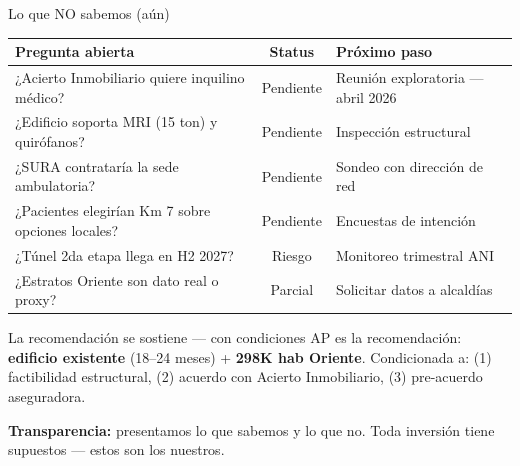 \documentclass[aspectratio=169, 11pt]{beamer}
\begin{document}
{
\begin{frame}{Lo que NO sabemos (aún)}
{\scriptsize
\begin{tabular}{@{}p{5cm}cp{5.5cm}@{}}
\toprule
\textbf{Pregunta abierta} & \textbf{Status} & \textbf{Próximo paso} \\
\midrule
\rowcolor{amber!8}
¿Acierto Inmobiliario quiere inquilino médico? & Pendiente & Reunión exploratoria --- abril 2026 \\
¿Edificio soporta MRI (15 ton) y quirófanos? & Pendiente & Inspección estructural \\
\rowcolor{amber!8}
¿SURA contrataría la sede ambulatoria? & Pendiente & Sondeo con dirección de red \\
¿Pacientes elegirían Km 7 sobre opciones locales? & Pendiente & Encuestas de intención \\
\rowcolor{amber!8}
¿Túnel 2da etapa llega en H2 2027? & Riesgo & Monitoreo trimestral ANI \\
¿Estratos Oriente son dato real o proxy? & Parcial & Solicitar datos a alcaldías \\
\bottomrule
\end{tabular}
}

\vspace{3pt}
\begin{exampleblock}{\small La recomendación se sostiene --- con condiciones}
\scriptsize
AP es la recomendación: \textbf{edificio existente} (18--24 meses) + \textbf{298K hab Oriente}. Condicionada a: (1) factibilidad estructural, (2) acuerdo con Acierto Inmobiliario, (3) pre-acuerdo aseguradora.
\end{exampleblock}

{\tiny\textcolor{amber!80!black}{\textbf{Transparencia:}} presentamos lo que sabemos y lo que no. Toda inversión tiene supuestos --- estos son los nuestros.}
\end{frame}
}
\end{document}
